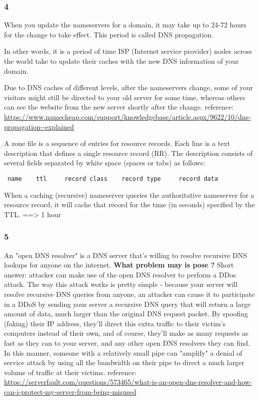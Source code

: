 \documentclass{article}
\begin{document}
    \subsubsection{4}
    When you update the nameservers for a domain, it may take up to 24-72 hours for the change to take effect. This period is called DNS propagation.

    In other words, it is a period of time ISP (Internet service provider) nodes across the world take to update their caches with the new DNS information of your domain.

    Due to DNS caches of different levels, after the nameservers change, some of your visitors might still be directed to your old server for some time, whereas others can see the website from the new server shortly after the change.\newline
    reference: \url{https://www.namecheap.com/support/knowledgebase/article.aspx/9622/10/dns-propagation--explained}

    A zone file is a sequence of entries for resource records. Each line is a text description that defines a single resource record (RR). The description consists of several fields separated by white space (spaces or tabs) as follows:
\begin{verbatim} name    ttl     record class    record type     record data\end{verbatim}
When a caching (recursive) nameserver queries the authoritative nameserver for a resource record, it will cache that record for the time (in seconds) specified by the TTL. ==> 1 hour
    \subsubsection{5}
	An "open DNS resolver" is a DNS server that's willing to resolve recursive DNS lookups for anyone on the internet.\newline
	\textbf{What problem may is pose ?}\newline
	Short answer: attacker can make use of the open DNS resolver to perform a DDos attack.\newline
	The way this attack works is pretty simple - because your server will resolve recursive DNS queries from anyone, an attacker can cause it to participate in a DDoS by sending your server a recursive DNS query that will return a large amount of data, much larger than the original DNS request packet. By spoofing (faking) their IP address, they'll direct this extra traffic to their victim's computers instead of their own, and of course, they'll make as many requests as fast as they can to your server, and any other open DNS resolvers they can find. In this manner, someone with a relatively small pipe can "amplify" a denial of service attack by using all the bandwidth on their pipe to direct a much larger volume of traffic at their victims.
	reference: \url{https://serverfault.com/questions/573465/what-is-an-open-dns-resolver-and-how-can-i-protect-my-server-from-being-misused}
\end{document}
